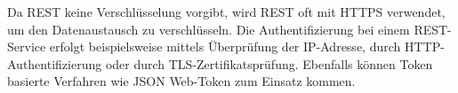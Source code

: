 
Da REST keine Verschlüsselung vorgibt, wird REST oft mit HTTPS verwendet, um den Datenaustausch zu verschlüsseln. Die Authentifizierung bei einem REST-Service erfolgt beispielsweise mittels Überprüfung der IP-Adresse, durch HTTP-Authentifizierung oder durch TLS-Zertifikatsprüfung. Ebenfalls können Token basierte Verfahren wie JSON Web-Token zum Einsatz kommen. \cite{WikiREST}